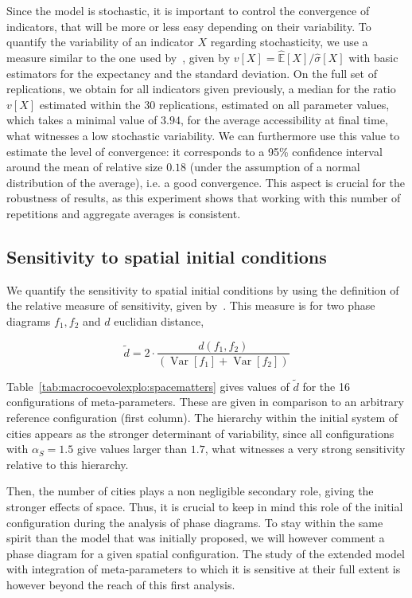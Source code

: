 \documentclass[graybox]{svmult}
\DeclareMathOperator{\Var}{Var}
\newcommand{\Varb}[1]{\ensuremath{\Var\!\left[#1\right]}}
\begin{document}
Since the model is stochastic, it is important to control the convergence of indicators, that will be more or less easy depending on their variability. To quantify the variability of an indicator $X$ regarding stochasticity, we use a measure similar to the one used by~\cite{raimbault2018calibration}, given by $v\left[X\right] = \hat{\mathbb{E}}\left[X\right]/\hat{\sigma}\left[X\right]$ with basic estimators for the expectancy and the standard deviation. On the full set of replications, we obtain for all indicators given previously, a median for the ratio $v\left[X\right]$ estimated within the 30 replications, estimated on all parameter values, which takes a minimal value of $3.94$, for the average accessibility at final time, what witnesses a low stochastic variability. We can furthermore use this value to estimate the level of convergence: it corresponds to a 95\% confidence interval around the mean of relative size $0.18$ (under the assumption of a normal distribution of the average), i.e. a good convergence. This aspect is crucial for the robustness of results, as this experiment shows that working with this number of repetitions and aggregate averages is consistent.


\subsection{Sensitivity to spatial initial conditions}

We quantify the sensitivity to spatial initial conditions by using the definition of the relative measure of sensitivity, given by~\cite{cottineau2017initial}. This measure is for two phase diagrams $f_1,f_2$ and $d$ euclidian distance, 

\begin{equation}
\tilde{d} = 2 \cdot \frac{d(f_1,f_2)}{(\Varb{f_1}+\Varb{f_2})}
\end{equation}

Table~\ref{tab:macrocoevolexplo:spacematters} gives values of $\tilde{d}$ for the 16 configurations of meta-parameters. These are given in comparison to an arbitrary reference configuration (first column). The hierarchy within the initial system of cities appears as the stronger determinant of variability, since all configurations with $\alpha_S = 1.5$ give values larger than $1.7$, what witnesses a very strong sensitivity relative to this hierarchy.

Then, the number of cities plays a non negligible secondary role, giving the stronger effects of space. Thus, it is crucial to keep in mind this role of the initial configuration during the analysis of phase diagrams. To stay within the same spirit than the model that was initially proposed, we will however comment a phase diagram for a given spatial configuration. The study of the extended model with integration of meta-parameters to which it is sensitive at their full extent is however beyond the reach of this first analysis.
\end{document}

